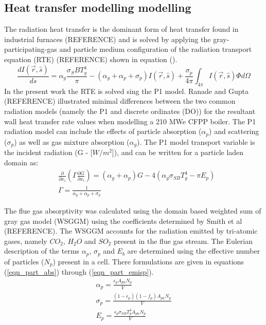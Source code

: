 \documentclass[review]{elsarticle}
\begin{document}
\subsection{Heat transfer modelling modelling}
The radiation heat transfer is the dominant form of heat transfer found in industrial furnaces (REFERENCE) and is solved by applying the gray-participating-gas and particle medium configuration of the radiation transport equation (RTE) (REFERENCE) shown in equation ().
\begin{equation}
\frac{d I(\vec{r},\hat{s})}{ds} = \alpha_g \frac{\sigma_SB T_{g}^4}{\pi}-(\alpha_g+\alpha_p+\sigma_p)I(\vec{r},\hat{s}) + \frac{\sigma_p}{4\pi}\int_{4\pi}I(\vec{r},\hat{s})\Phi d \Omega
\end{equation}
In the present work the RTE is solved sing the P1 model. Ranade and Gupta (REFERENCE) illustrated minimal differences between the two common radiation models (namely the P1 and discrete ordinates (DO)) for the resultant wall heat transfer rate values when modelling a 210 MWe CFPP boiler. The P1 radiation model can include the effects of particle absorption ($\alpha_p$) and scattering ($\sigma_p$) as well as gas mixture absorption ($\alpha_g$). The P1 model transport variable is the incident radiation (G - [$W/m^2$]), and can be written for a particle laden domain as:
\begin{equation}
\begin{split}
&\frac{\partial}{\partial x_{i}}\left(\Gamma\frac{\partial G}{\partial x_{i}}\right)=\left(\alpha_g+\alpha_p\right)G-4\left(\alpha_g \sigma_{SB} T_{g}^4-\pi E_p \right)\\
&\Gamma = \frac{1}{\alpha_g+\alpha_p+\sigma_p}
\end{split}
\end{equation}

The flue gas absorptivity was calculated using the domain based weighted sum of gray gas model (WSGGM) using the coefficients determined by Smith et al (REFERENCE). The WSGGM accounts for the radiation emitted by tri-atomic gases, namely $CO_2$, $H_2O$ and $SO_2$ present in the flue gas stream. The Eulerian description of the terms $\alpha_p$, $\sigma_p$ and $E_b$ are determined using the effective number of particles ($N_p$) present in a cell. There formulations are given in equations (\ref{eqn_part_abs}) through (\ref{eqn_part_emisp}).
\begin{gather}
\alpha_p = \frac{\epsilon_p A_{pn}N_p}{V} \label{eqn_part_abs}\\
\sigma_p = \frac{(1-\epsilon_p)(1-f_p) A_{pn}N_p}{V} \label{eqn_part_scat} \\
E_p = \frac{\epsilon_p \sigma_{SB} T_p^4 A_{pn}N_p}{V}\label{eqn_part_emisp}
\end{gather}
\end{document}
